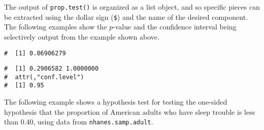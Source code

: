 \documentclass[letterpaper,12pt,twoside,]{pinp}
\begin{document}
The output of \texttt{prop.test()} is organized as a list object, and so
specific pieces can be extracted using the dollar sign (\texttt{\$}) and
the name of the desired component. The following examples show the
\(p\)-value and the confidence interval being selectively output from
the example shown above.

\begin{Shaded}
\begin{Highlighting}[]
\NormalTok{(} \NormalTok{, } \NormalTok{, } \NormalTok{, } \NormalTok{, } \NormalTok{)}\OperatorTok{$}
\end{Highlighting}
\end{Shaded}

\begin{ShadedResult}
\begin{verbatim}
#  [1] 0.06906279
\end{verbatim}
\end{ShadedResult}

\begin{Shaded}
\begin{Highlighting}[]
\NormalTok{(} \NormalTok{, } \NormalTok{, } \NormalTok{, } \NormalTok{, } \NormalTok{)}\OperatorTok{$}
\end{Highlighting}
\end{Shaded}

\begin{ShadedResult}
\begin{verbatim}
#  [1] 0.2906582 1.0000000
#  attr(,"conf.level")
#  [1] 0.95
\end{verbatim}
\end{ShadedResult}

The following example shows a hypothesis test for testing the one-sided
hypothesis that the proportion of American adults who have sleep trouble
is less than 0.40, using data from \texttt{nhanes.samp.adult}.

\begin{Shaded}
\begin{Highlighting}[]
\NormalTok{(}\NormalTok{)}

\NormalTok{(}\OperatorTok{$}\OperatorTok{==}\NormalTok{), }
          \OperatorTok{$} \NormalTok{, } \NormalTok{)}
\end{Highlighting}
\end{Shaded}
\end{document}
